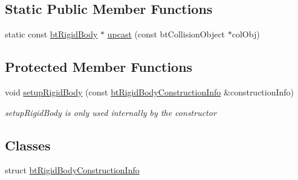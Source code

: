 \subsection*{Static Public Member Functions}
\begin{CompactItemize}
\item 
static const \hyperlink{classbt_rigid_body}{btRigidBody} $\ast$ \hyperlink{classbt_rigid_body_59077fce3d2efd193a3fd7d7de2c97e8}{upcast} (const btCollisionObject $\ast$colObj)
\end{CompactItemize}
\subsection*{Protected Member Functions}
\begin{CompactItemize}
\item 
\hypertarget{classbt_rigid_body_daa57210b4f5388b63a11db376358dd0}{
void \hyperlink{classbt_rigid_body_daa57210b4f5388b63a11db376358dd0}{setupRigidBody} (const \hyperlink{structbt_rigid_body_1_1bt_rigid_body_construction_info}{btRigidBodyConstructionInfo} \&constructionInfo)}
\label{classbt_rigid_body_daa57210b4f5388b63a11db376358dd0}

\begin{CompactList}\small\item\em setupRigidBody is only used internally by the constructor \item\end{CompactList}\end{CompactItemize}
\subsection*{Classes}
\begin{CompactItemize}
\item 
struct \hyperlink{structbt_rigid_body_1_1bt_rigid_body_construction_info}{btRigidBodyConstructionInfo}
\end{CompactItemize}


